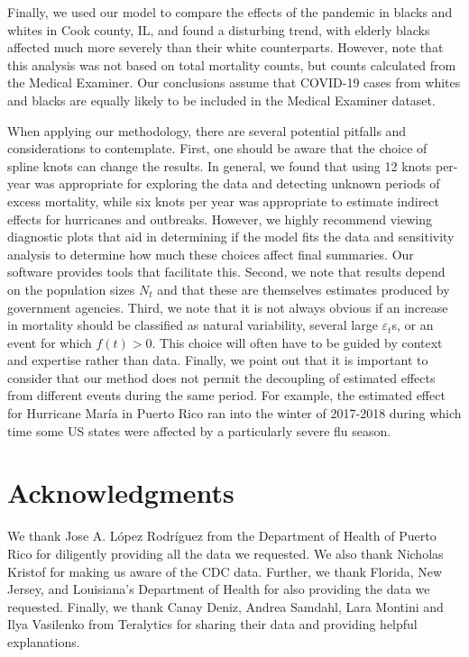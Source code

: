 \documentclass[11pt]{article}
\begin{document}
Finally, we used our model to compare the effects of the pandemic in blacks and whites in Cook county, IL,  and found a disturbing trend, with elderly blacks affected much more severely than their white counterparts. However, note that this analysis was not based on total mortality counts, but counts calculated from the Medical Examiner. Our conclusions assume that COVID-19 cases from whites and blacks are equally likely to be included in the Medical Examiner dataset.  

When applying our methodology, there are several potential pitfalls and considerations to contemplate. First, one should be aware that the choice of spline knots can change the results.  In general, we found that using 12 knots per-year was appropriate for exploring the data and detecting unknown periods of excess mortality, while six knots per year was appropriate to estimate indirect effects for hurricanes and outbreaks. However, we highly recommend viewing diagnostic plots that aid in determining if the model fits the data and sensitivity analysis to determine how much these choices affect final summaries. Our software provides tools that facilitate this. Second, we note that  results depend on the population sizes $N_t$ and that these are themselves estimates produced by government agencies. Third, we note that it is not always obvious if an increase in mortality should be classified as natural variability, several large $\varepsilon_t$s, or an event for which $f(t)>0$. This choice will often have to be guided by context and expertise rather than data. Finally, we point out that it is important to consider that our method does not permit the decoupling of estimated effects from different events during the same period. For example, the estimated effect for Hurricane Mar\'ia in Puerto Rico ran into the winter of 2017-2018 during which time some US states were affected by a particularly severe flu season. 

\section{Acknowledgments}
We thank Jose A. L\'opez Rodr\'iguez from the Department of Health of Puerto Rico for diligently providing all the data we requested. We also thank Nicholas Kristof for making us aware of the CDC data. Further, we thank Florida, New Jersey, and Louisiana's Department of Health for also providing the data we requested. Finally, we thank Canay Deniz, Andrea Samdahl, Lara Montini and Ilya Vasilenko from Teralytics for sharing their data and providing helpful explanations. \\
\end{document}
